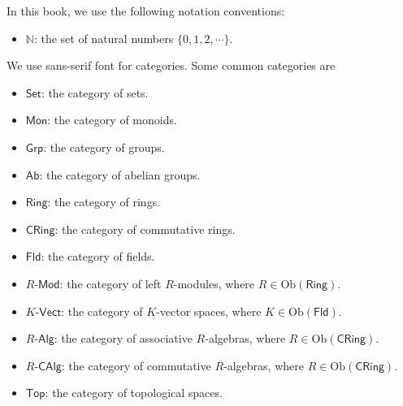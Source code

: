 \documentclass{report}
\begin{document}
In this book, we use the following notation conventions:
\begin{itemize}
    \item $\mathbb{N}$: the set of natural numbers $\{0,1,2,\cdots\}$.
\end{itemize}
We use sans-serif font for categories. Some common categories are
\begin{itemize}
    \item $\mathsf{Set}$: the category of sets.
    \item $\mathsf{Mon}$: the category of monoids.
    \item $\mathsf{Grp}$: the category of groups.
    \item $\mathsf{Ab}$: the category of abelian groups.
    \item $\mathsf{Ring}$: the category of rings.
    \item $\mathsf{CRing}$: the category of commutative rings.
    \item $\mathsf{Fld}$: the category of fields.
    \item $R\text{-}\mathsf{Mod}$: the category of left $R$-modules, where $R\in \mathrm{Ob}\left(\mathsf{Ring}\right)$.
    \item $K\text{-}\mathsf{Vect}$: the category of $K$-vector spaces, where $K\in \mathrm{Ob}\left(\mathsf{Fld}\right)$.
    \item $R\text{-}\mathsf{Alg}$: the category of associative $R$-algebras, where $R\in \mathrm{Ob}\left(\mathsf{CRing}\right)$.
    \item $R\text{-}\mathsf{CAlg}$: the category of commutative $R$-algebras, where $R\in \mathrm{Ob}\left(\mathsf{CRing}\right)$.
    \item $\mathsf{Top}$: the category of topological spaces.
\end{itemize}












\end{document}
